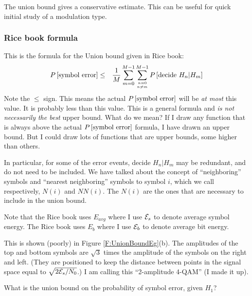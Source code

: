 The union bound gives a conservative estimate.  This can be useful
for quick initial study of a modulation type.

\subsubsection{Rice book formula}
This is the formula for the Union bound given in Rice book:
\begin{eqnarray} \label{E:RiceUnionBound}
  P\left[{\mbox{symbol error}}\right] &\le & \frac{1}{M} \sum_{m=0}^{M-1} \sum_{n=0 \atop n\neq m}^{M-1} P\left[{\mbox{decide } H_n | H_m}\right]
 \nonumber
\end{eqnarray}
Note the $\le$ sign.  This means the actual $P\left[{\mbox{symbol error}}\right]$ will be \textit{at most} this value.  It is probably less than this value.  This is a general formula and \textit{is not necessarily the best} upper bound.  What do we mean?  If I draw any function that is always above the actual $P\left[{\mbox{symbol error}}\right]$ formula, I have drawn an upper bound.  But I could draw lots of functions that are upper bounds, some higher than others.

In particular, for some of the error events, decide $H_n | H_m$ may be redundant, and do not need to be included.  We have talked about the concept of ``neighboring'' symbols and ``nearest neighboring'' symbols to symbol $i$, which we call respectively, $N(i)$ and $NN(i)$.  The $N(i)$ are the ones that are necessary to include in the union bound.

Note that the Rice book uses $E_{avg}$ where I use $\mathcal{E}_s$ to denote
average symbol energy.  The Rice book uses $E_b$ where I use $\mathcal{E}_b$
to denote average bit energy. 



  This is shown (poorly) in
Figure \ref{F:UnionBoundEg}(b).  The amplitudes of the top and
bottom symbols are $\sqrt{3}$ times the amplitude of the symbols on
the right and left.  (They are positioned to keep the distance
between points in the signal space equal to $\sqrt{2\mathcal{E}_s/N_0}$.)  I
am calling this ``2-amplitude 4-QAM'' (I made it up).

What is the union bound on the probability of symbol error, given
$H_1$? 


